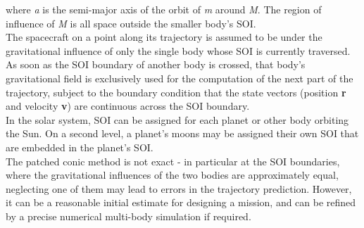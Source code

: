 \documentclass[Orbiter User Manual.tex]{subfiles}
\begin{document}
\noindent
where \textit{a} is the semi-major axis of the orbit of \textit{m} around \textit{M}. The region of influence of \textit{M} is all space outside the smaller body's SOI.\\
The spacecraft on a point along its trajectory is assumed to be under the gravitational influence of only the single body whose SOI is currently traversed. As soon as the SOI boundary of another body is crossed, that body's gravitational field is exclusively used for the computation of the next part of the trajectory, subject to the boundary condition that the state vectors (position \textbf{r} and velocity \textbf{v}) are continuous across the SOI boundary.\\
In the solar system, SOI can be assigned for each planet or other body orbiting the Sun. On a second level, a planet's moons may be assigned their own SOI that are embedded in the planet's SOI.\\
The patched conic method is not exact - in particular at the SOI boundaries, where the gravitational influences of the two bodies are approximately equal, neglecting one of them may lead to errors in the trajectory prediction. However, it can be a reasonable initial estimate for designing a mission, and can be refined by a precise numerical multi-body simulation if required.
\end{document}
